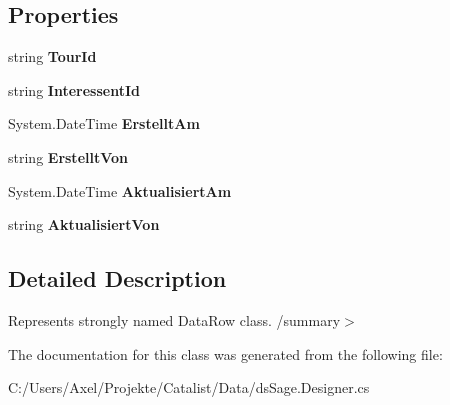 \subsection*{Properties}
\begin{DoxyCompactItemize}
\item 
string {\bfseries Tour\+Id}\hypertarget{class_products_1_1_data_1_1ds_sage_1_1_tour_interessent_xref_row_aa705771b54d0aa57811c23181344f343}{}\label{class_products_1_1_data_1_1ds_sage_1_1_tour_interessent_xref_row_aa705771b54d0aa57811c23181344f343}

\item 
string {\bfseries Interessent\+Id}\hypertarget{class_products_1_1_data_1_1ds_sage_1_1_tour_interessent_xref_row_a0b84870bea1a219afdcf6b358dc1029b}{}\label{class_products_1_1_data_1_1ds_sage_1_1_tour_interessent_xref_row_a0b84870bea1a219afdcf6b358dc1029b}

\item 
System.\+Date\+Time {\bfseries Erstellt\+Am}\hypertarget{class_products_1_1_data_1_1ds_sage_1_1_tour_interessent_xref_row_a3c7983af6fbe72857b4ecf914eb244d8}{}\label{class_products_1_1_data_1_1ds_sage_1_1_tour_interessent_xref_row_a3c7983af6fbe72857b4ecf914eb244d8}

\item 
string {\bfseries Erstellt\+Von}\hypertarget{class_products_1_1_data_1_1ds_sage_1_1_tour_interessent_xref_row_a6664577f805b8283b3d2478706dff646}{}\label{class_products_1_1_data_1_1ds_sage_1_1_tour_interessent_xref_row_a6664577f805b8283b3d2478706dff646}

\item 
System.\+Date\+Time {\bfseries Aktualisiert\+Am}\hypertarget{class_products_1_1_data_1_1ds_sage_1_1_tour_interessent_xref_row_a526fd172f2c4066c0917c4ce75bace6d}{}\label{class_products_1_1_data_1_1ds_sage_1_1_tour_interessent_xref_row_a526fd172f2c4066c0917c4ce75bace6d}

\item 
string {\bfseries Aktualisiert\+Von}\hypertarget{class_products_1_1_data_1_1ds_sage_1_1_tour_interessent_xref_row_a8c726920df4604fba368eb25e889c8b3}{}\label{class_products_1_1_data_1_1ds_sage_1_1_tour_interessent_xref_row_a8c726920df4604fba368eb25e889c8b3}

\end{DoxyCompactItemize}


\subsection{Detailed Description}
Represents strongly named Data\+Row class. /summary$>$ 

The documentation for this class was generated from the following file\+:\begin{DoxyCompactItemize}
\item 
C\+:/\+Users/\+Axel/\+Projekte/\+Catalist/\+Data/ds\+Sage.\+Designer.\+cs\end{DoxyCompactItemize}
